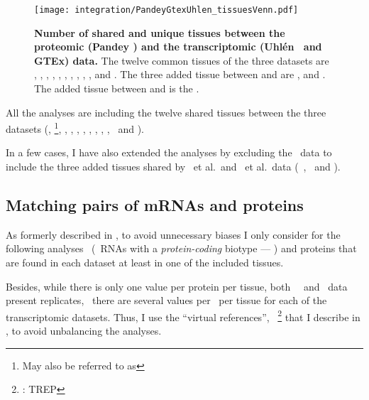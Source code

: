 \begin{figure}[!htbp]
    \texttt{[image: integration/PandeyGtexUhlen\_tissuesVenn.pdf]}
    \centering
    \vspace{-5mm}
    \caption[Number of shared and unique tissues between the proteomic
    dataset from Pandey \etal\ and the transcriptomic datasets (Uhlén \etal\ and
    Gtex)]{\label{fig:VennTissuePandeyGtexUhlen}\textbf{Number of shared and unique
    tissues between the proteomic (Pandey \etal) and the
    transcriptomic (Uhlén \etal\ and GTEx) data.} The twelve common tissues of
    the three datasets are
    , , , ,
    , , , , ,
    ,  and . The three added
    tissue between  and  are
    ,  and . The added tissue
    between  and  is the .}
\end{figure}

All the analyses are including the twelve shared tissues between the three
datasets (\adrenal, \Bladder{}\footnote{May also
be referred to as },
\hColon, \Oesophagus, \Heart,
\Kidney, \Liver, \Lung, \Ovary, \Pancreas,
\Prostate\ and \Testis).

\vspace{-1.5mm}
In a few cases, I have also extended the analyses by excluding the \gtex\ data
to include the three added tissues shared by
\pandey\ et al.\ and \uhlen\ et al.\ data (\ie\ \Gall, \Placenta\ and \Rectum).

\vspace{-2mm}
\subsection{Matching pairs of mRNAs and proteins}

\vspace{-3mm}
As formerly described in ,
to avoid unnecessary biases I only consider for the following analyses
\mRNAs\ (\ie\ \glspl{RNA} with a \emph{protein-coding} biotype --- )
and proteins that are found in each dataset at least in one of the included tissues.

Besides, while there is only one value per protein per tissue,
both \uhlen\ \etal\ and \gtex\ data present replicates,
\ie\ there are several values per \mRNA\ per tissue
for each of the transcriptomic datasets.
Thus, I use the \enquote{virtual references},
\ie\ \treps\footnote{\trep{}: \glsdesc{TREP}}
that I describe in ,
to avoid unbalancing the analyses.\\
\vspace{-\baselineskip}

